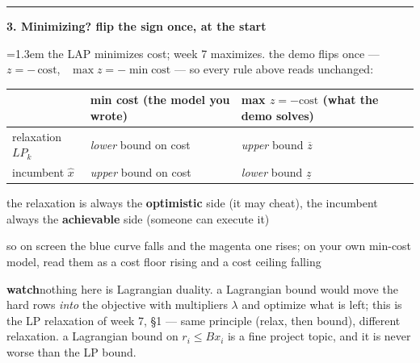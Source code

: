 \documentclass[10pt]{article}
\newcommand{\beat}[2]{%
  \par\medskip
  {\color{ruleink}\rule{\textwidth}{1pt}}\par\nobreak\vspace{2pt}
  {\large\bfseries #1.\; #2}\par\nobreak\vspace{3pt}}
\newenvironment{board}{%
  \par\vspace{2pt}
  \begingroup\leftskip=1.3em\relax}{%
  \par\endgroup\vspace{2pt}}
\newcommand{\watch}[1]{\par{\color{watchink}\small\textbf{watch}\quad #1}\par}
\begin{document}
\beat{3}{Minimizing? flip the sign once, at the start}
\begin{board}
the LAP minimizes cost; week 7 maximizes. the demo flips once --- $z = -\,\text{cost}$, \ $\max z = -\min \text{cost}$ ---
so every rule above reads unchanged:
\begin{center}
\begin{tabular}{@{}l|l|l@{}}
 & \textbf{min cost} (the model you wrote) & \textbf{max $z = -\text{cost}$} (what the demo solves) \\ \hline
 relaxation $LP_k$ & \emph{lower} bound on cost & \emph{upper} bound $\overline{z}$ \\[2pt]
 incumbent $\hat{x}$ & \emph{upper} bound on cost & \emph{lower} bound $\underline{z}$ \\
\end{tabular}
\end{center}
\vspace{2pt}

\quad the relaxation is always the \textbf{optimistic} side (it may cheat), the incumbent always the \textbf{achievable} side
(someone can execute it)
\vspace{1pt}

\quad so on screen the blue curve falls and the magenta one rises; on your own min-cost model, read them as a cost floor
rising and a cost ceiling falling
\end{board}
\watch{nothing here is Lagrangian duality. a Lagrangian bound would move the hard rows \emph{into} the objective with
multipliers $\lambda$ and optimize what is left; this is the LP relaxation of week 7, \S 1 --- same principle (relax, then
bound), different relaxation. a Lagrangian bound on $r_i \le B x_i$ is a fine project topic, and it is never worse than
the LP bound.}
\end{document}
